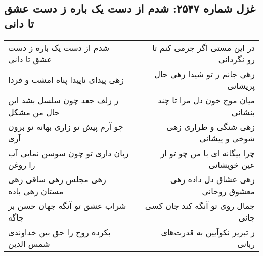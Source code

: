 \begin{center}
\section*{غزل شماره ۲۵۴۷: شدم از دست یک باره ز دست عشق تا دانی}
\label{sec:2547}
\begin{longtable}{l p{0.5cm} r}
شدم از دست یک باره ز دست عشق تا دانی
&&
در این مستی اگر جرمی کنم تا رو نگردانی
\\
زهی پیدای ناپیدا پناه امشب و فردا
&&
زهی جانم ز تو شیدا زهی حال پریشانی
\\
ز زلف جعد چون سلسل بشد این حال من مشکل
&&
میان موج خون دل مرا تا چند بنشانی
\\
چو آرم پیش تو زاری بهانه نو برون آری
&&
زهی شنگی و طراری زهی شوخی و پیشانی
\\
زبان داری تو چون سوسن نمایی آب را روغن
&&
چرا بیگانه ای با من چو تو از عین خویشانی
\\
زهی مجلس زهی ساقی زهی مستان زهی باده
&&
زهی عشاق دل داده زهی معشوق روحانی
\\
شراب عشق تو آنگه جهان حسن بر جاگه
&&
جمال روی تو آنگه کند جان کسی جانی
\\
بکرده روح را حق بین خداوندی شمس الدین
&&
ز تبریز نکوآیین به قدرت‌های ربانی
\\
\end{longtable}
\end{center}
